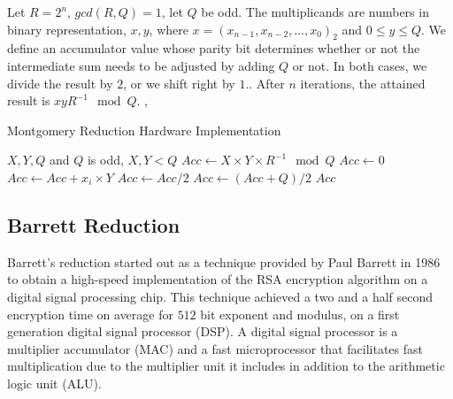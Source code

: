 \documentclass[11pt,
  titlepage=false,
  abstract=on,
]{scrreprt}
\begin{document}
Let $R=2^n$, $gcd(R, Q)=1$, let $Q$ be odd. The multiplicands are numbers in binary representation, $x, y$, where $x = (x_{n-1}, x_{n-2},...,x_{0})_2$ and $0 \leq y \leq Q$. 
We define an accumulator value whose parity bit determines whether or not the intermediate sum needs to be adjusted by adding $Q$ or not. In both cases, we divide the result by
$2$, or we shift right by $1.$. After $n$ iterations, the attained result is $xyR^{-1} \mod Q$. \cite{montgomery1985modular}, \cite{7219961}

\begin{algorithm}
  \caption{Montgomery Reduction Hardware Implementation}
  \label{alg:montgomery}
  \begin{algorithmic}[1]
  \REQUIRE \( X, Y, Q \) and \( Q \) is odd, \( X, Y < Q \)
  \renewcommand{\algorithmicensure}{\textbf{Output:}}
  \ENSURE \( Acc \leftarrow X \times Y \times R^{-1} \mod Q \)
  \STATE \( Acc \leftarrow 0 \)
      \STATE \( Acc \leftarrow Acc + x_i \times Y \)
          \STATE \( Acc \leftarrow Acc / 2 \)
      \ELSE
          \STATE \( Acc \leftarrow (Acc + Q) / 2 \)
      \ENDIF
  \ENDFOR
  \RETURN \( Acc \)
  \end{algorithmic}
\end{algorithm}



\subsection{Barrett Reduction}
Barrett's reduction \cite{barrett1986implementing} started out as a technique provided by Paul Barrett in 1986 to obtain a high-speed implementation of the RSA encryption algorithm
on a digital signal processing chip. This technique achieved a two and a half second encryption time on average for $512$ bit exponent and modulus, on a first generation digital signal processor (DSP).
A digital signal processor is a multiplier accumulator (MAC) and a fast microprocessor that facilitates fast multiplication due to the multiplier unit it includes in addition to the arithmetic logic unit (ALU).
\end{document}
